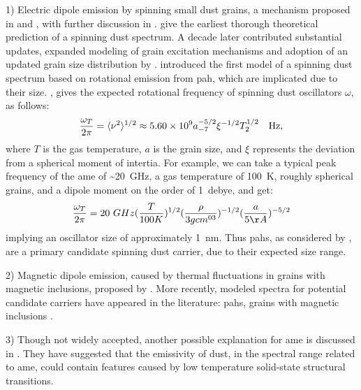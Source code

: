     1) Electric dipole emission by spinning small dust grains, a mechanism proposed in \cite{erickson57} and \cite{hoyle70}, with further discussion in \cite{ferrara94}. \cite{draine98b} give the earliest thorough theoretical prediction of a spinning dust spectrum. A decade later \cite{ali-haimoud09} contributed substantial updates, expanded modeling of grain excitation mechanisms and adoption of an updated grain size distribution by \cite{weingartner01}. \cite{ysard10a} introduced the first model of a spinning dust spectrum based on rotational emission from \gls{pah}, which are implicated due to their size.  \cite{draine98b}, gives the expected rotational frequency of spinning dust oscillators $\omega$,  as follows:
        \begin{equation}
        {\omega_T\over 2\pi} =
        \langle\nu^2\rangle^{1/2}
        \approx 5.60\times 10^9 a_{-7}^{-5/2}\xi^{-1/2}T_2^{1/2}~~~{\rm Hz},
        \label{eq:nurms}
        \end{equation}
    where $T$ is the gas temperature, $a$ is the grain size, and $\xi$ represents the deviation from a spherical moment of intertia. For example, we can take a typical peak frequency of the \gls{ame} of \textasciitilde{}20~GHz, a gas temperature of 100~K, roughly spherical grains, and a dipole moment on the order of 1~debye, and get:
        \begin{equation}
            {\omega_T\over 2\pi} =
                20~GHz({T\over 100K})^{1/2}({\rho \over{3gcm^{03}}})^{-1/2}({a\over 5\AA{}})^{-5/2}
            \label{eq:nurms_ex}
        \end{equation}
    implying an oscillator size of approximately 1~nm. Thus \gls{pah}s, as considered by \cite{ysard10a}, are a primary candidate spinning dust carrier, due to their expected size range.

    2) Magnetic dipole emission, caused by thermal fluctuations in grains with magnetic inclusions, proposed by \cite{draine99}.
     More recently, modeled spectra for potential candidate carriers have appeared in the literature: \gls{pah}s, grains with magnetic inclusions \citep{draine13, ali-haimoud14, hoang16a}.

    3) Though not widely accepted, another possible explanation for \gls{ame} is discussed in \cite{jones09}. They have suggested that the emissivity of dust, in the spectral range related to \gls{ame}, could contain features caused by low temperature solid-state structural transitions.

